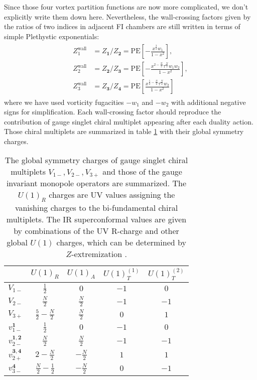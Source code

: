 \documentclass[a4paper,11pt]{article}
\begin{document}
Since those four vortex partition functions are now more complicated, we don't explicitly write them down here. Nevertheless, the wall-crossing factors given by the ratios of two indices in adjacent FI chambers are still written in terms of simple Plethystic exponentials:
\begin{align}
\begin{aligned}
Z^\text{wall}_1 &= Z_{\mathbf 1}/Z_{\mathbf 2} = \mathrm{PE} \left[-\frac{x^{\frac{3}{2}} w_1}{1-x^2}\right], \\
Z^\text{wall}_2 &= Z_{\mathbf 2}/Z_{\mathbf 3} = \mathrm{PE} \left[-\frac{x^{2-\frac{N}{2}} \tau^{\frac{N}{2}} w_1 w_2}{1-x^2}\right], \\
Z^\text{wall}_3 &= Z_{\mathbf 3}/Z_{\mathbf 4} = \mathrm{PE} \left[\frac{x^{\frac{5}{2}-\frac{N}{2}} \tau^{\frac{N}{2}} w_2}{1-x^2}\right]
\end{aligned}
\end{align}
where we have used vorticity fugacities $-w_1$ and $-w_2$ with additional negative signs for simplification. Each wall-crossing factor should reproduce the contribution of gauge singlet chiral multiplet appearing after each duality action. Those chiral multiplets are summarized in table \ref{tab:monopoles} with their global symmetry charges.
%
\begin{table}[tbp]
\centering
\begin{tabular}{|c|cccc|}
\hline
 & $U(1)_R$ & $U(1)_A$ & $U(1)_T^{(1)}$ & $U(1)_T^{(2)}$ \\
\hline
$V_{1-}$ & $\frac{1}{2}$ & $0$ & $-1$ & $0$ \\
$V_{2-}$ & $\frac{N}{2}$ & $\frac{N}{2}$ & $-1$ & $-1$ \\
$V_{3+}$ & $\frac{5}{2}-\frac{N}{2}$ & $\frac{N}{2}$ & $0$ & $1$ \\
\hline
$v_{1-}^{\mathbf 1}$ & $\frac{1}{2}$ & $0$ & $-1$ & $0$ \\
$v_{2-}^{\mathbf {1,2}}$ & $\frac{N}{2}$ & $\frac{N}{2}$ & $-1$ & $-1$ \\
$v_{2+}^{\mathbf {3,4}}$ & $2-\frac{N}{2}$ & $-\frac{N}{2}$ & $1$ & $1$ \\
$v_{3-}^{\mathbf 4}$ & $\frac{N}{2}-\frac{1}{2}$ & $-\frac{N}{2}$ & $0$ & $-1$ \\
\hline
\end{tabular}
\caption{\label{tab:monopoles} The global symmetry charges of gauge singlet chiral multiplets $V_{1-},V_{2-},V_{3+}$ and those of the gauge invariant monopole operators are summarized. The $U(1)_R$ charges are UV values assigning the vanishing charges to the bi-fundamental chiral multiplets. The IR superconformal values are given by combinations of the UV R-charge and other global $U(1)$ charges, which can be determined by $Z$-extremization \cite{Jafferis:2010un}.}
\end{table}
%
\end{document}
